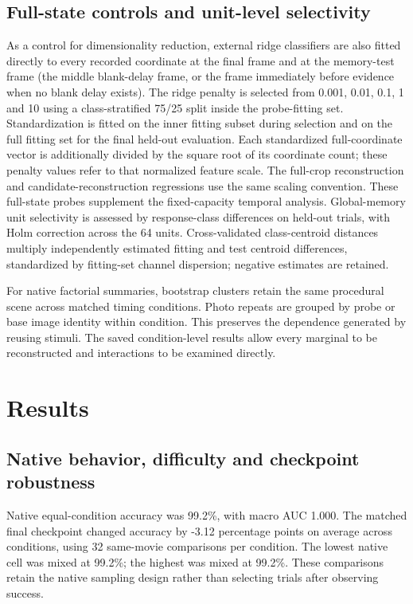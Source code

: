 \documentclass[11pt]{article}
\begin{document}
\subsection{Full-state controls and unit-level selectivity}
As a control for dimensionality reduction, external ridge classifiers are also fitted directly to every recorded coordinate at the final frame and at the memory-test frame (the middle blank-delay frame, or the frame immediately before evidence when no blank delay exists). The ridge penalty is selected from 0.001, 0.01, 0.1, 1 and 10 using a class-stratified 75/25 split inside the probe-fitting set. Standardization is fitted on the inner fitting subset during selection and on the full fitting set for the final held-out evaluation. Each standardized full-coordinate vector is additionally divided by the square root of its coordinate count; these penalty values refer to that normalized feature scale. The full-crop reconstruction and candidate-reconstruction regressions use the same scaling convention. These full-state probes supplement the fixed-capacity temporal analysis. Global-memory unit selectivity is assessed by response-class differences on held-out trials, with Holm correction across the 64 units. Cross-validated class-centroid distances multiply independently estimated fitting and test centroid differences, standardized by fitting-set channel dispersion; negative estimates are retained.

For native factorial summaries, bootstrap clusters retain the same procedural scene across matched timing conditions. Photo repeats are grouped by probe or base image identity within condition. This preserves the dependence generated by reusing stimuli. The saved condition-level results allow every marginal to be reconstructed and interactions to be examined directly.
\section{Results}
\subsection{Native behavior, difficulty and checkpoint robustness}
Native equal-condition accuracy was 99.2\%, with macro AUC 1.000. The matched final checkpoint changed accuracy by -3.12 percentage points on average across conditions, using 32 same-movie comparisons per condition. The lowest native cell was mixed at 99.2\%; the highest was mixed at 99.2\%. These comparisons retain the native sampling design rather than selecting trials after observing success.
\end{document}
